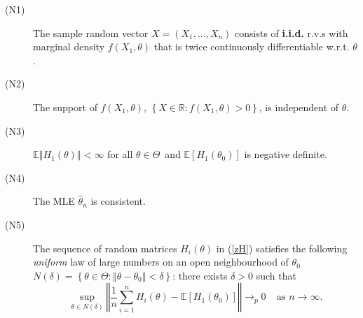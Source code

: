 \documentclass[notes=show]{beamer}
\begin{document}
\begin{frame}%


\begin{description}
\item[(N1)] The sample random vector $X=\left( X_{1},...,X_{n}\right) $
consists of \textbf{i.i.d.} r.v.s with marginal density $f\left(
X_{1},\theta \right) $ that is twice continuously differentiable w.r.t. $%
\theta $.

\item[(N2)] The support of $f\left( X_{1},\theta \right) $, $\left\{ X\in 
\mathbb{R}:f\left( X_{1},\theta \right) >0\right\} $, is independent of $%
\theta $.

\item[(N3)] $\mathbb{E}\left\Vert H_{1}\left( \theta \right) \right\Vert
<\infty $ for all $\theta \in \Theta $\ and $\mathbb{E}\left[ H_{1}\left(
\theta _{0}\right) \right] $ is negative definite.

\item[(N4)] The MLE $\hat{\theta}_{n}$ is consistent.

\item[(N5)] The sequence of random matrices $H_{i}\left( \theta \right) $ in
(\ref{zH}) satisfies the following \textit{uniform} law of large numbers on
an open neighbourhood of $\theta _{0}$ $N\left( \delta \right) =\left\{
\theta \in \Theta :\left\Vert \theta -\theta _{0}\right\Vert <\delta
\right\} $: there exists $\delta >0$ such that%
\begin{equation}
\sup_{\theta \in N\left( \delta \right) }\left\Vert \frac{1}{n}%
\sum_{i=1}^{n}H_{i}\left( \theta \right) -\mathbb{E}\left[ H_{1}\left(
\theta _{0}\right) \right] \right\Vert \rightarrow _{p}0\;\;\;\;\text{as }%
n\rightarrow \infty .  \label{ULLN}
\end{equation}
\end{description}

\end{frame}%
\end{document}
